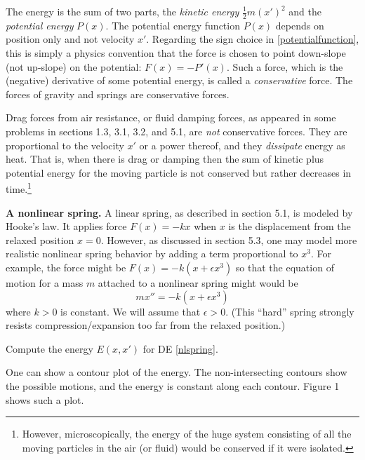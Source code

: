 \documentclass[12pt]{article}
\theoremstyle{definition}
\newcommand{\eps}{\epsilon}
\begin{document}
The energy is the sum of two parts, the \emph{kinetic energy} $\frac{1}{2} m (x')^2$ and the \emph{potential energy} $P(x)$.  The potential energy function $P(x)$ depends on position only and not velocity $x'$.  Regarding the sign choice in \eqref{potentialfunction}, this is simply a physics convention that the force is chosen to point down-slope (not up-slope) on the potential: $F(x)=-P'(x)$.  Such a force, which is the (negative) derivative of some potential energy, is called a \emph{conservative} force.  The forces of gravity and springs are conservative forces.

Drag forces from air resistance, or fluid damping forces, as appeared in some problems in sections 1.3, 3.1, 3.2, and 5.1, are \emph{not} conservative forces.  They are proportional to the velocity $x'$ or a power thereof, and they \emph{dissipate} energy as heat.  That is, when there is drag or damping then the sum of kinetic plus potential energy for the moving particle is not conserved but rather decreases in time.\footnote{However, microscopically, the energy of the huge system consisting of all the moving particles in the air (or fluid) would be conserved if it were isolated.}

\medskip
\textbf{A nonlinear spring.}  A linear spring, as described in section 5.1, is modeled by Hooke's law.  It applies force $F(x)=-kx$ when $x$ is the displacement from the relaxed position $x=0$.  However, as discussed in section 5.3, one may model more realistic nonlinear spring behavior by adding a term proportional to $x^3$.  For example, the force might be $F(x)=-k(x + \eps x^3)$ so that the equation of motion for a mass $m$ attached to a nonlinear spring might would be
\begin{equation}
m x'' = - k (x + \eps x^3) \label{nlspring}
\end{equation}
where $k>0$ is constant.  We will assume that $\eps>0$.  (This ``hard'' spring strongly resists compression/expansion too far from the relaxed position.)

\begin{prob}
Compute the energy $E(x,x')$ for DE \eqref{nlspring}.
\end{prob}

One can show a contour plot of the energy.  The non-intersecting contours show the possible motions, and the energy is constant along each contour.  Figure 1 shows such a plot.
\end{document}

